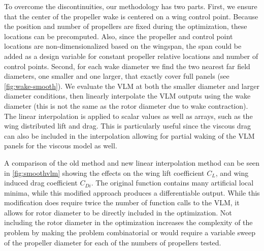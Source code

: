 \documentclass[conf]{new-aiaa}
\begin{document}
To overcome the discontinuities, our methodology has two parts. First, we ensure that the center of the propeller wake is centered on a wing control point. Because the position and number of propellers are fixed during the optimization, these locations can be precomputed. Also, since the propeller and control point locations are non-dimensionalized based on the wingspan, the span could be added as a design variable for constant propeller relative locations and number of control points. Second, for each wake diameter we find the two nearest far field diameters, one smaller and one larger, that exactly cover full panels (see \cref{fig:wake-smooth}). We evaluate the VLM at both the smaller diameter and larger diameter conditions, then linearly interpolate the VLM outputs using the wake diameter (this is not the same as the rotor diameter due to wake contraction). The linear interpolation is applied to scalar values as well as arrays, such as the wing distributed lift and drag. This is particularly useful since the viscous drag can also be included in the interpolation allowing for partial waking of the VLM panels for the viscous model as well.

A comparison of the old method and new linear interpolation method can be seen in \cref{fig:smoothvlm} showing the effects on the wing lift coefficient $C_L$, and wing induced drag coefficient $C_{Di}$. The original function contains many artificial local minima, while this modified approach produces a differentiable output. While this modification does require twice the number of function calls to the VLM, it allows for rotor diameter to be directly included in the optimization. Not including the rotor diameter in the optimization increases the complexity of the problem by making the problem combinatorial or would require a variable sweep of the propeller diameter for each of the numbers of propellers tested.
\end{document}
